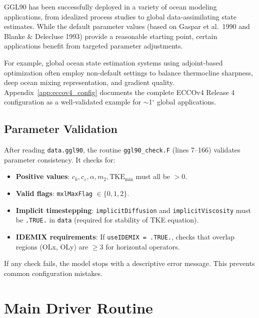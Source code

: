 \documentclass[12pt,letterpaper]{article}
\newcommand{\TKE}{\mathrm{TKE}}
\begin{document}
GGL90 has been successfully deployed in a variety of ocean modeling applications,
from idealized process studies to global data-assimilating state estimates. While
the default parameter values (based on Gaspar et al.\ 1990 and Blanke \& Delecluse
1993) provide a reasonable starting point, certain applications benefit from
targeted parameter adjustments.

For example, global ocean state estimation systems using adjoint-based
optimization often employ non-default settings to balance thermocline sharpness,
deep ocean mixing representation, and gradient quality. Appendix~\ref{app:eccov4_config}
documents the complete ECCOv4 Release 4 configuration as a well-validated
example for $\sim$1$^\circ$ global applications.

\subsection{Parameter Validation}

After reading \texttt{data.ggl90}, the routine \texttt{ggl90\_check.F} (lines
7--166) validates parameter consistency. It checks for:

\begin{itemize}[leftmargin=*]
  \item \textbf{Positive values}: $c_k, c_\varepsilon, \alpha, m_2, \TKE_{\mathrm{min}}$
        must all be $> 0$.
  \item \textbf{Valid flags}: \texttt{mxlMaxFlag} $\in \{0, 1, 2\}$.
  \item \textbf{Implicit timestepping}: \texttt{implicitDiffusion} and
        \texttt{implicitViscosity} must be \texttt{.TRUE.} in \texttt{data}
        (required for stability of TKE equation).
  \item \textbf{IDEMIX requirements}: If \texttt{useIDEMIX = .TRUE.}, checks
        that overlap regions (OLx, OLy) are $\geq 3$ for horizontal operators.
\end{itemize}

If any check fails, the model stops with a descriptive error message. This
prevents common configuration mistakes.

\section{Main Driver Routine}
\label{sec:main_driver}
\label{sec:ggl90_calc}
\end{document}
